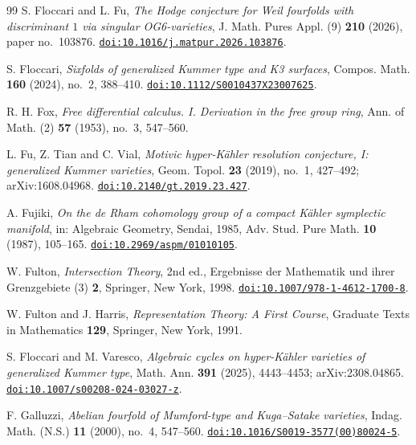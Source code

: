 \begin{thebibliography}{99}
S. Floccari and L. Fu,
\emph{The Hodge conjecture for Weil fourfolds with discriminant $1$ via
singular OG6-varieties},
J. Math. Pures Appl. (9) \textbf{210} (2026), paper no.~103876.
\href{https://doi.org/10.1016/j.matpur.2026.103876}{\texttt{doi:10.1016/j.matpur.2026.103876}}.

S. Floccari,
\emph{Sixfolds of generalized Kummer type and K3 surfaces},
Compos. Math. \textbf{160} (2024), no.~2, 388--410.
\href{https://doi.org/10.1112/S0010437X23007625}{\texttt{doi:10.1112/S0010437X23007625}}.

R. H. Fox,
\emph{Free differential calculus. I. Derivation in the free group ring},
Ann. of Math. (2) \textbf{57} (1953), no.~3, 547--560.

L. Fu, Z. Tian and C. Vial,
\emph{Motivic hyper-K\"ahler resolution conjecture, I: generalized Kummer
varieties},
Geom. Topol. \textbf{23} (2019), no.~1, 427--492; arXiv:1608.04968.
\href{https://doi.org/10.2140/gt.2019.23.427}{\texttt{doi:10.2140/gt.2019.23.427}}.

A. Fujiki,
\emph{On the de Rham cohomology group of a compact K\"ahler symplectic
manifold},
in: Algebraic Geometry, Sendai, 1985, Adv. Stud. Pure Math. \textbf{10}
(1987), 105--165.
\href{https://doi.org/10.2969/aspm/01010105}{\texttt{doi:10.2969/aspm/01010105}}.

W. Fulton,
\emph{Intersection Theory}, 2nd ed.,
Ergebnisse der Mathematik und ihrer Grenzgebiete (3) \textbf{2},
Springer, New York, 1998.
\href{https://doi.org/10.1007/978-1-4612-1700-8}{\texttt{doi:10.1007/978-1-4612-1700-8}}.

W. Fulton and J. Harris,
\emph{Representation Theory: A First Course},
Graduate Texts in Mathematics \textbf{129}, Springer, New York, 1991.

S. Floccari and M. Varesco,
\emph{Algebraic cycles on hyper-K\"ahler varieties of generalized Kummer
type},
Math. Ann. \textbf{391} (2025), 4443--4453; arXiv:2308.04865.
\href{https://doi.org/10.1007/s00208-024-03027-z}{\texttt{doi:10.1007/s00208-024-03027-z}}.

F. Galluzzi,
\emph{Abelian fourfold of Mumford-type and Kuga--Satake varieties},
Indag. Math. (N.S.) \textbf{11} (2000), no.~4, 547--560.
\href{https://doi.org/10.1016/S0019-3577(00)80024-5}{\texttt{doi:10.1016/S0019-3577(00)80024-5}}.


\end{thebibliography}
